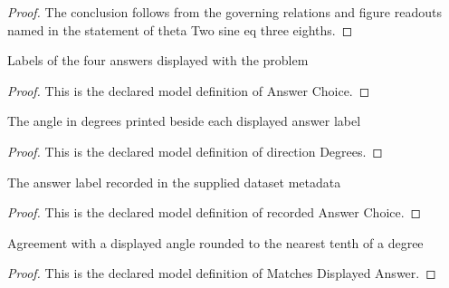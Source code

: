 \begin{proof}
  The conclusion follows from the governing relations and figure readouts named in the statement of theta Two sine eq three eighths.
\end{proof}
\begin{definition}
  \label{def:physics:phyx-mini-0174:phyxminiproblems-problemphyxmini0174-answerchoice}
  Labels of the four answers displayed with the problem
\end{definition}
\begin{proof}
  This is the declared model definition of Answer Choice.
\end{proof}
\begin{definition}
  \label{def:physics:phyx-mini-0174:phyxminiproblems-problemphyxmini0174-answerchoice-directiondegrees}
  The angle in degrees printed beside each displayed answer label
\end{definition}
\begin{proof}
  This is the declared model definition of direction Degrees.
\end{proof}
\begin{definition}
  \label{def:physics:phyx-mini-0174:phyxminiproblems-problemphyxmini0174-recordedanswerchoice}
  The answer label recorded in the supplied dataset metadata
\end{definition}
\begin{proof}
  This is the declared model definition of recorded Answer Choice.
\end{proof}
\begin{definition}
  \label{def:physics:phyx-mini-0174:phyxminiproblems-problemphyxmini0174-matchesdisplayedanswer}
  Agreement with a displayed angle rounded to the nearest tenth of a degree
\end{definition}
\begin{proof}
  This is the declared model definition of Matches Displayed Answer.
\end{proof}
